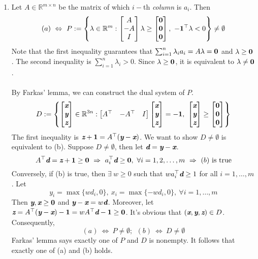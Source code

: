 \begin{enumerate}
	\newpage 
	\item Let $A \in \mathbb{R}^{m\times n}$ be the matrix of which $i-$th \textit{column} is $a_i$. Then
	\[
	(a) ~\Leftrightarrow~ P:=\left\{\lambda\in \mathbb{R}^m: \begin{bmatrix}
	A \\-A\\I
	\end{bmatrix} \lambda \ge \begin{bmatrix}
	\textbf{0}\\\textbf{0}\\\textbf{0}
	\end{bmatrix},~ - \textbf{1}^\top \lambda < 0 \right\} \neq \emptyset
	\]
	Note that the first inequality guarantees that $\sum_{i=1}^n \lambda_ia_i = A \lambda = \textbf{0}$ and $\lambda \ge \textbf{0}$. The second inequality is $\sum_{i=1}^n\lambda_i > 0$. Since $\lambda \ge \textbf{0}$, it is equivalent to $\lambda \neq \textbf{0}$.
	~\\\\
	By Farkas' lemma, we can construct the dual system of $P$.
	\[
	D:=\left\{ \begin{bmatrix}
	\textit{\textbf{x}} \\ \textit{\textbf{y}} \\ \textit{\textbf{z}}
	\end{bmatrix} \in \mathbb{R}^{3n}:  \begin{bmatrix}
	A^\top &-A^\top&I
	\end{bmatrix}\begin{bmatrix}
	\textit{\textbf{x}} \\ \textit{\textbf{y}} \\ \textit{\textbf{z}}
	\end{bmatrix} = -\textbf{1},~ \begin{bmatrix}
	\textit{\textbf{x}} \\ \textit{\textbf{y}} \\ \textit{\textbf{z}}
	\end{bmatrix} \ge \begin{bmatrix}
	\textbf{0}\\\textbf{0}\\\textbf{0}
	\end{bmatrix} \right\}
	\] 
	The first inequality is $ \textit{\textbf{z}} + \textbf{1} = A^\top (\textit{\textbf{y}} - \textit{\textbf{x}})$. We want to show $D\neq \emptyset$ is equivalent to (b). Suppose $D\neq \emptyset$, then let $\textit{\textbf{d}} = \textit{\textbf{y}}-\textit{\textbf{x}}$. 
	\[
	  A^\top \textit{\textbf{d}} = \textit{\textbf{z}} + \textbf{1}\ge \textbf{0} ~\Rightarrow~a_i^\top \textit{\textbf{d}} \ge \textbf{0},~ \forall i=1,2,\ldots,m ~\Rightarrow~ (b) \text{ is true}
	\]
	Conversely, if (b) is true, then $\exists ~w\ge 0$ such that $wa_i^\top \textit{\textbf{d}} \ge 1$ for all $i=1,\ldots,m$. Let 
	\[
	y_i = \max\{wd_i, 0 \},~x_i=\max\{ -wd_i,0\},~\forall i=1,\ldots,m
	\]	
	Then $\textit{\textbf{y}}, \textit{\textbf{x}} \ge \textbf{0}$ and $\textit{\textbf{y}} - \textit{\textbf{x}} = w\textit{\textbf{d}}$. Moreover, let $\textit{\textbf{z}} = A^\top (\textit{\textbf{y}} - \textit{\textbf{x}}) - \textbf{1} = wA^\top\textit{\textbf{d}} -\textbf{1} \ge \textbf{0}$. It's obvious that $(\textit{\textbf{x}}, \textit{\textbf{y}},\textit{\textbf{z}})\in D$. Consequently,
	\[
	(a) ~\Leftrightarrow~ P \neq \emptyset;~~(b) ~\Leftrightarrow~ D\neq \emptyset
	\]
	Farkas' lemma says exactly one of $P$ and $D$ is nonempty. It follows that exactly one of (a) and (b) holds.
	

\end{enumerate}

